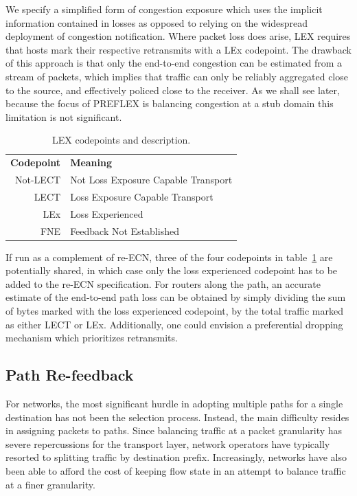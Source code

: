 We specify a simplified form of congestion exposure which uses the implicit information contained in losses as opposed to relying on the widespread deployment of congestion notification. Where packet loss does arise, \ac{LEX} requires that hosts mark their respective retransmits with a \ac{LEx} codepoint. The drawback of this approach is that only the end-to-end congestion can be estimated from a stream of packets, which implies that traffic can only be reliably aggregated close to the source, and effectively policed close to the receiver. As we shall see later, because the focus of \ac{PREFLEX} is balancing congestion at a stub domain this limitation is not significant.

\begin{table}
\centering
\begin{tabular}{r|l}
    \textbf{Codepoint} & \textbf{Meaning} \\
    Not-LECT & Not Loss Exposure Capable Transport \\
    LECT & Loss Exposure Capable Transport \\ 
    LEx  & Loss Experienced \\ 
    FNE  & Feedback Not Established \\
\end{tabular}
\caption{LEX codepoints and description.}
\label{table:codepoint}
\end{table}

If run as a complement of re-\ac{ECN}, three of the four codepoints in table~\ref{table:codepoint} are potentially shared, in which case only the loss experienced codepoint has to be added to the re-\ac{ECN} specification. For routers along the path, an accurate estimate of the end-to-end path loss can be obtained by simply dividing the sum of bytes marked with the loss experienced codepoint, by the total traffic marked as either \ac{LECT} or \ac{LEx}. Additionally, one could envision a preferential dropping mechanism which prioritizes retransmits.


\subsection{Path Re-feedback}

For networks, the most significant hurdle in adopting multiple paths for a single destination has not been the selection process. Instead, the main difficulty resides in assigning packets to paths. Since balancing traffic at a packet granularity has severe repercussions for the transport layer, network operators have typically resorted to splitting traffic by destination prefix. Increasingly, networks have also been able to afford the cost of keeping flow state in an attempt to balance traffic at a finer granularity. 

